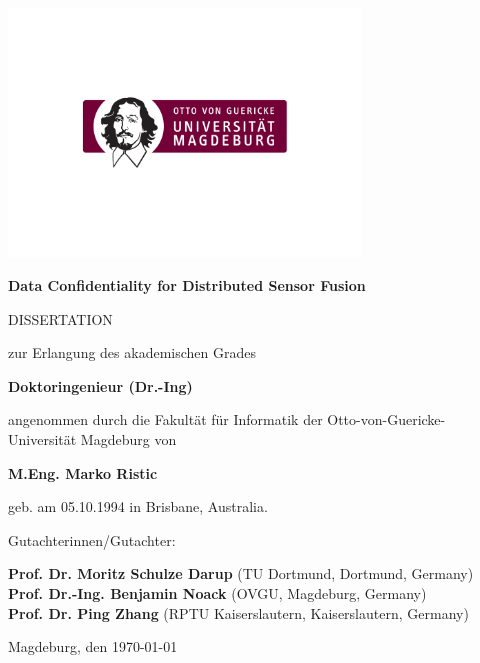 \documentclass[oneside]{scrbook}
\theoremstyle{definition}
\theoremstyle{definition}
\theoremstyle{remark}
\begin{document}
\begin{titlepage}
    \thispagestyle{empty}
    \begin{center}
        \includegraphics[trim=0.5cm 3cm 0.5cm 3cm, width=0.7\textwidth]{figures/ovgu_logo}

        \huge
        \textbf{Data Confidentiality for Distributed Sensor Fusion}
        
        \vspace{2\baselineskip}
        \LARGE
        DISSERTATION

        \vspace{\baselineskip}
        \large
        zur Erlangung des akademischen Grades 
        
        \vspace{0.5\baselineskip}
        \textbf{Doktoringenieur (Dr.-Ing)}
        
        \vspace{0.5\baselineskip}
        angenommen durch die Fakultät für Informatik der Otto-von-Guericke-Universität Magdeburg von
        
        \vspace{0.5\baselineskip}
        \textbf{M.Eng. Marko Ristic}
        
        \vspace{0.5\baselineskip}
        geb. am 05.10.1994 in Brisbane, Australia.

        \vfill
        \normalsize
        Gutachterinnen/Gutachter:

        \vspace{0.5\baselineskip}
        \textbf{Prof. Dr. Moritz Schulze Darup} 
        (TU Dortmund, Dortmund, Germany)\\
        \vspace{0.5\baselineskip}
        \textbf{Prof. Dr.-Ing. Benjamin Noack} 
        (OVGU, Magdeburg, Germany)\\
        \vspace{0.5\baselineskip}
        \textbf{Prof. Dr. Ping Zhang} 
        (RPTU Kaiserslautern, Kaiserslautern, Germany)

        \vfill
        \large
        Magdeburg, den \today
    \end{center}
\end{titlepage}
\end{document}
